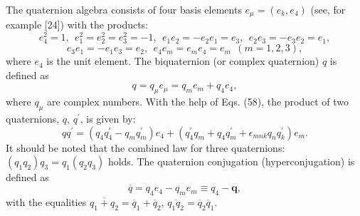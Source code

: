 \documentclass[a4paper,12pt]{article}
\begin{document}
The quaternion algebra consists of four basis elements $ e_\mu
=(e_k,e_4)$ (see, for example [24]) with the products:
\[
e_4^2=1,~~e_1^2=e_2^2=e_3^2=-1 ,~~e_1e_2=-e_2e_1=e_3
,~~e_2e_3=-e_3e_2=e_1 ,
\]
\vspace{-7mm}
\begin{equation}
\label{58}
\end{equation}
\vspace{-7mm}
\[
e_3e_1=-e_1e_3=e_2 ,~~ e_4e_m=e_me_4=e_m ~~(m=1, 2, 3) ,
\]
where $e_4$ is the unit element. The biquaternion (or complex
quaternion) $q$ is defined as
\begin{equation}
q=q_\mu e_\mu =q_me_m+q_4e_4 ,  \label{59}
\end{equation}
where $q_\mu $ are complex numbers. With the help of Eqs. (58),
the product of two quaternions, $q$, $q^{\prime }$, is given by:
\begin{equation}
qq^{\prime }=\left( q_4q_4^{\prime }-q_mq_m^{\prime }\right)
e_4+\left( q_4^{\prime }q_m+q_4q_m^{\prime }+\epsilon
_{mnk}q_nq_k^{\prime }\right) e_m . \label{60}
\end{equation}
It should be noted that the combined law for three quaternions:
$\left( q_1q_2\right) q_3=q_1\left( q_2q_3\right)$ holds. The
quaternion conjugation (hyperconjugation) is defined as
\begin{equation}
\overline{q}=q_4e_4-q_me_m\equiv q_4-\mathbf{q} ,  \label{61}
\end{equation}
with the equalities
$\overline{q_1+q_2}=\overline{q}_1+\overline{q}_2$, $
\overline{q_1q_2}=\overline{q}_2\overline{q}_1$.
\end{document}
